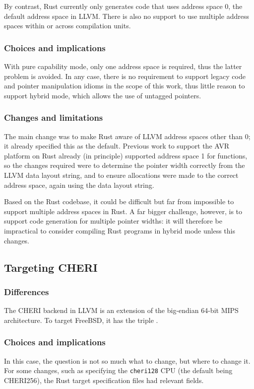 \documentclass[dissertation.tex]{subfiles}
\begin{document}
By contrast, Rust currently only generates code that uses address space
0, the default address space in LLVM.
There is also no support to use multiple address spaces within or across
compilation units.

\subsubsection{Choices and implications}
With pure capability mode, only one address space is required, thus the
latter problem is avoided.
In any case, there is no requirement to support legacy code and pointer
manipulation idioms in the scope of this work, thus little reason to
support hybrid mode, which allows the use of untagged pointers.

\subsubsection{Changes and limitations}
The main change was to make Rust aware of LLVM address spaces other than
0; it already specified this as the default.
Previous work to support the AVR platform on Rust already (in principle)
supported address space 1 for functions, so the changes required were to
determine the pointer width correctly from the LLVM data layout string,
and to ensure allocations were made to the correct address space, again
using the data layout string.

Based on the Rust codebase, it could be difficult but far from
impossible to support multiple address spaces in Rust.
A far bigger challenge, however, is to support code generation for
multiple pointer widths: it will therefore be impractical to consider
compiling Rust programs in hybrid mode unless this changes.


\subsection{Targeting CHERI}
\label{sec:impl-cheritarget}

\subsubsection{Differences}
The CHERI backend in LLVM is an extension of the big-endian 64-bit MIPS
architecture.
To target FreeBSD, it has the triple \cuf.

\subsubsection{Choices and implications}
In this case, the question is not so much what to change, but where to
change it.
For some changes, such as specifying the \texttt{cheri128} CPU (the
default being CHERI256), the Rust target specification files had
relevant fields.
\end{document}
